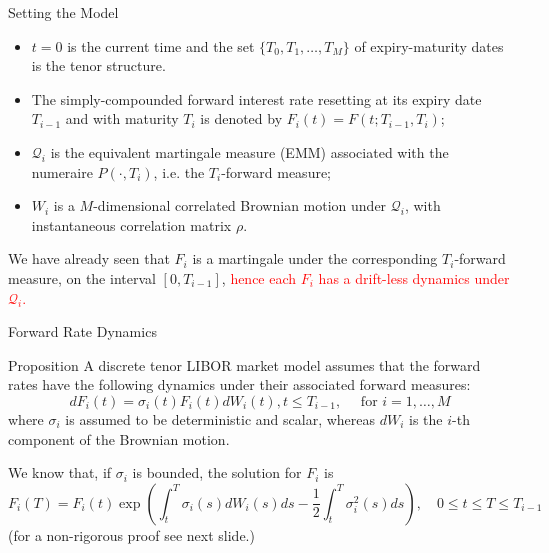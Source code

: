 \documentclass{beamer}
\begin{document}
\begin{frame}{Setting the Model}
  \begin{itemize}
  \item $t = 0$ is the current time and the set $\{T_0, T_1, \dots, T_M\}$ of expiry-maturity dates is the tenor structure. %
  \item The simply-compounded forward interest rate resetting at its expiry date $T_{i-1}$ and with maturity $T_i$ is denoted by $F_i(t) = F(t; T_{i-1}, T_i)$; %
  \item $\mathcal{Q}_i$ is the equivalent martingale measure (EMM) associated with the numeraire $P(\cdot, T_i)$, i.e. the $T_i$-forward measure;
  \item $W_i$ is a $M$-dimensional correlated Brownian motion under $\mathcal{Q}_i$, with instantaneous correlation matrix $\rho$.
  \end{itemize}
  We have already seen that $F_i$ is a martingale under the corresponding $T_i$-forward measure, on the interval $[0, T_{i-1}]$, \textcolor{red}{hence each $F_i$ has a drift-less dynamics under $\mathcal{Q}_i$.}
\end{frame}

\begin{frame}{Forward Rate Dynamics}
  \begin{block}{Proposition}
    A discrete tenor LIBOR market model assumes that the forward rates have the following dynamics under their associated forward measures:
    \begin{equation}
      dF_i(t) = \sigma_i(t)F_i(t)dW_i(t), t \le T_{i-1},\quad\text{ for } i = 1,\ldots, M
      \label{eq:forward_process_lmm}
    \end{equation}
    where $\sigma_i$ is assumed to be deterministic and scalar, whereas $dW_i$ is the $i$-th component of the Brownian motion.
  \end{block}
  We know that, if $\sigma_i$ is bounded, the solution for $F_i$ is 
  \begin{equation*}
    F_i(T) = F_i(t) \exp\left(\int_t^T\sigma_i(s)dW_i(s)ds - \frac{1}{2}\int_t^T 
    \sigma_i^2(s)ds\right),\quad 0\le t \le T \le T_{i-1} 
  \end{equation*}
  (for a non-rigorous proof see next slide.)
\end{frame}
\end{document}
